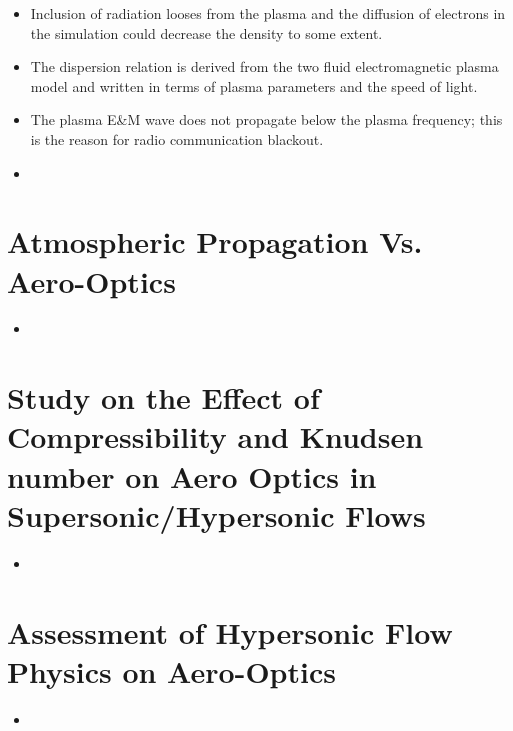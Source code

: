 \begin{itemize}
            \item Inclusion of radiation looses from the plasma and the diffusion of electrons in the simulation could decrease the density to some extent. 
            \item The dispersion relation is derived from the two fluid electromagnetic plasma model and written in terms of plasma parameters and the speed of light.
            \item The plasma E\&M wave does not propagate below the plasma frequency; this is the reason for radio communication blackout.
            \item  
        \end{itemize}

        
    \section{Atmospheric Propagation Vs. Aero-Optics \cite{doi:10.2514/6.2008-1076}} 
        \begin{itemize} 
            \item 
        \end{itemize}


    \section{Study on the Effect of Compressibility and Knudsen number on Aero Optics in Supersonic/Hypersonic Flows \cite{doi:10.2514/6.2012-2988}} 
        \begin{itemize} 
            \item 
        \end{itemize}

    \section{Assessment of Hypersonic Flow Physics on Aero-Optics \cite{doi:10.2514/1.J057869}} 
        \begin{itemize} 
            \item 
        \end{itemize}

    \newpage
    \printbibliography[title=Bibliography]

